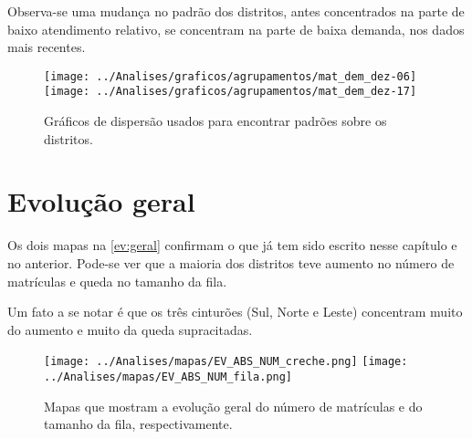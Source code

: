 Observa-se uma mudança no padrão dos distritos, antes concentrados na parte de baixo atendimento relativo, se concentram na parte de baixa demanda, nos dados mais recentes.

\begin{figure}[H]
	\centering
	\texttt{[image: ../Analises/graficos/agrupamentos/mat\_dem\_dez-06]}
	\texttt{[image: ../Analises/graficos/agrupamentos/mat\_dem\_dez-17]}
	\caption{Gráficos de dispersão usados para encontrar padrões sobre os distritos.}
	\label{graf:geral}
\end{figure}

\section{Evolução geral}

Os dois mapas na \autoref{ev:geral} confirmam o que já tem sido escrito nesse capítulo e no anterior. Pode-se ver que a maioria dos distritos teve aumento no número de matrículas e queda no tamanho da fila.

Um fato a se notar é que os três cinturões (Sul, Norte e Leste) concentram muito do aumento e muito da queda supracitadas.

\begin{figure}[H]
	\centering
	\texttt{[image: ../Analises/mapas/EV\_ABS\_NUM\_creche.png]}
	\texttt{[image: ../Analises/mapas/EV\_ABS\_NUM\_fila.png]}
	\caption{Mapas que mostram a evolução geral do número de matrículas e do tamanho da fila, respectivamente.}
	\label{ev:geral}
\end{figure}


